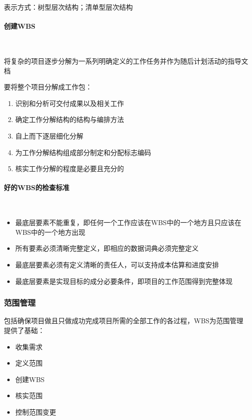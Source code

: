 表示方式：树型层次结构；清单型层次结构

\paragraph{创建WBS}~{} \par
将复杂的项目逐步分解为一系列明确定义的工作任务并作为随后计划活动的指导文档

要将整个项目分解成工作包：
\vspace{-0.8em}
\begin{multicols}{2}
    \begin{enumerate}[label=\arabic*.]
        \item 识别和分析可交付成果以及相关工作
        \item 确定工作分解结构的结构与编排方法
        \item 自上而下逐层细化分解
        \item 为工作分解结构组成部分制定和分配标志编码
        \item 核实工作分解的程度是必要且充分的
    \end{enumerate}
\end{multicols}
\vspace{-1em}

\paragraph{好的WBS的检查标准}~{} \par
\begin{itemize}
    \item 最底层要素不能重复，即任何一个工作应该在WBS中的一个地方且只应该在WBS中的一个地方出现
    \item 所有要素必须清晰完整定义，即相应的数据词典必须完整定义
    \item 最底层要素必须有定义清晰的责任人，可以支持成本估算和进度安排
    \item 最底层要素是实现目标的成分必要条件，即项目的工作范围得到完整体现
\end{itemize}

\subsubsection{范围管理}
包括确保项目做且只做成功完成项目所需的全部工作的各过程，WBS为范围管理提供了基础：
\vspace{-0.8em}
\begin{multicols}{5}
    \begin{itemize}
        \item 收集需求
        \item 定义范围
        \item 创建WBS
        \item 核实范围
        \item 控制范围变更
    \end{itemize}
\end{multicols}
\vspace{-1em}

